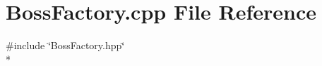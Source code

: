 \section{Boss\-Factory.\-cpp File Reference}
\label{_boss_factory_8cpp}
{\ttfamily \#include \char`\"{}Boss\-Factory.\-hpp\char`\"{}}\\*
